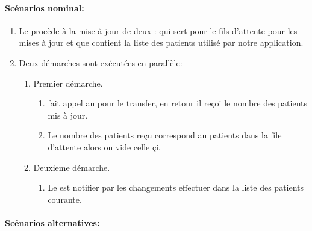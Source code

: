 \paragraph{Scénarios nominal:}

\begin{enumerate}

\item Le  procède à la mise à jour de deux :  qui sert pour le fils d'attente pour les mises à jour et  que contient la liste des patients utilisé par notre application.

\item Deux démarches sont exécutées en parallèle:\label{enu:par}

\begin{enumerate}[label=\ref{enu:par}.\Alph*]

\item Premier démarche.\label{enu:par1}

\begin{enumerate}[label=\ref{enu:par1}.\arabic*]

\item {} fait appel au  pour le transfer, en retour il reçoi le nombre des patients mis à jour.

\item Le nombre des patients reçu correspond au patients dans la file d'attente alors on vide celle çi.\label{enu:equalpatients}

\end{enumerate}

\item Deuxieme démarche.\label{enu:par2}

\begin{enumerate}[label=\ref{enu:par2}.\arabic*]

\item Le  est notifier par les changements effectuer dans la liste des patients courante.

\end{enumerate}

\end{enumerate}

\end{enumerate}

\paragraph{Scénarios alternatives:}


